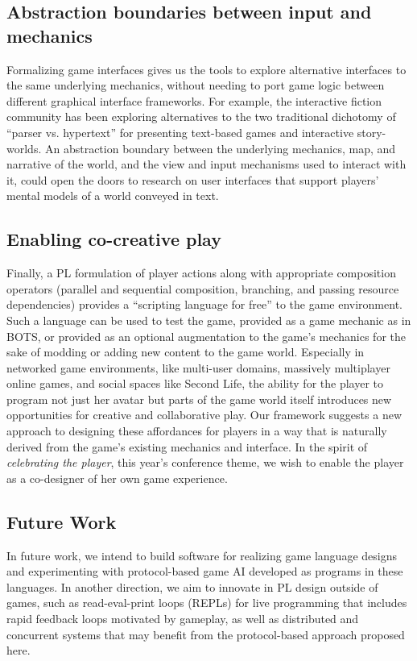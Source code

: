 \subsection{Abstraction boundaries between input and mechanics}


Formalizing game interfaces gives us the tools to explore alternative
interfaces to the same underlying mechanics, without needing to port
game logic between different graphical interface frameworks. For example,
the interactive fiction community has been exploring alternatives to the
two traditional dichotomy of ``parser vs. hypertext'' for presenting
text-based games and interactive story-worlds. An abstraction boundary
between the underlying mechanics, map, and narrative of the world, and the
view and input mechanisms used to interact with it, could open the doors to
research on user interfaces that support players' mental models of a world
conveyed in text.

\subsection{Enabling co-creative play}

Finally, a PL formulation of player actions along with appropriate
composition operators (parallel and sequential composition, branching, and
passing resource dependencies) provides a ``scripting language for free''
to the game environment. 
Such a language can be used to test the game, provided as a game mechanic
as in BOTS, or provided as an optional augmentation to the game's mechanics
for the sake of modding or adding new content to the game world. Especially
in networked game environments, like multi-user domains, massively
multiplayer online games, and social spaces like Second Life, the ability
for the player to program not just her avatar but parts of the game world
itself introduces new opportunities for creative and collaborative play.
Our framework suggests a new approach to designing these affordances for
players in a way that is naturally derived from the game's existing
mechanics and interface.  In the spirit of {\em celebrating the player},
this year's conference theme, we wish to enable the player as a
co-designer of her own game experience.


\subsection{Future Work}
  In future work, we intend to build software for realizing game language
  designs and experimenting with protocol-based game AI developed as
  programs in these languages. In another direction, we aim to innovate in
  PL design outside of games, such as read-eval-print loops (REPLs) for
  live programming that includes rapid feedback loops motivated by
  gameplay, as well as distributed and concurrent systems that may benefit
  from the protocol-based approach proposed here.

